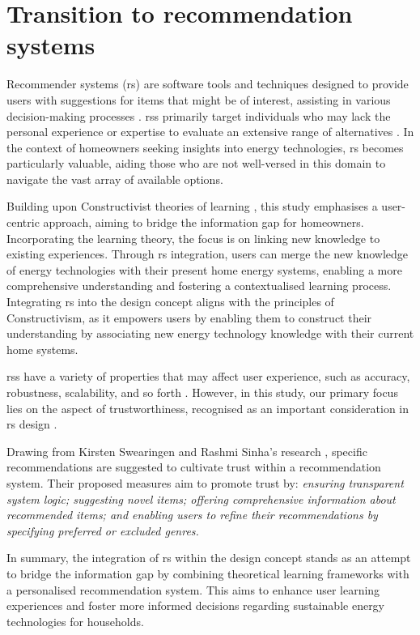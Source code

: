 \section{Transition to recommendation systems}

Recommender systems (\gls{rs}) are software tools and techniques designed to provide users with suggestions for items that might be of interest, 
assisting in various decision-making processes \cite{Ricci2011}. 
\gls{rs}s primarily target individuals who may lack the personal experience or expertise to evaluate an extensive range of alternatives \cite{Ricci2011}. 
In the context of homeowners seeking insights into energy technologies, 
\gls{rs} becomes particularly valuable, aiding those who are not well-versed in this domain to navigate the vast array of available options.

Building upon Constructivist theories of learning \cite{Bada2015}, 
this study emphasises a user-centric approach, aiming to bridge the information gap for homeowners.
Incorporating the learning theory, the focus is on linking new knowledge to existing experiences. 
Through \gls{rs} integration, users can merge the new knowledge of energy technologies with their present home energy systems, 
enabling a more comprehensive understanding and fostering a contextualised learning process.
Integrating \gls{rs} into the design concept aligns with the principles of Constructivism,
as it empowers users by enabling them to construct their understanding by associating new energy technology knowledge with their current home systems.

\gls{rs}s have a variety of properties that may affect user experience, 
such as accuracy, robustness, scalability, and so forth \cite{Shani2011}. 
However, in this study, our primary focus lies on the aspect of trustworthiness, 
recognised as an important consideration in \gls{rs} design \cite{Donovan2005}.

Drawing from Kirsten Swearingen and Rashmi Sinha's research \cite{rs},
specific recommendations are suggested to cultivate trust within a recommendation system.
Their proposed measures aim to promote trust by:
\emph{
  ensuring transparent system logic; 
  suggesting novel items; 
  offering comprehensive information about recommended items; 
  and enabling users to refine their recommendations by specifying preferred or excluded genres.
}

In summary, the integration of \gls{rs} within the design concept stands as an attempt to bridge the information gap 
by combining theoretical learning frameworks with a personalised recommendation system. 
This aims to enhance user learning experiences and foster more informed decisions regarding sustainable energy technologies for households.


